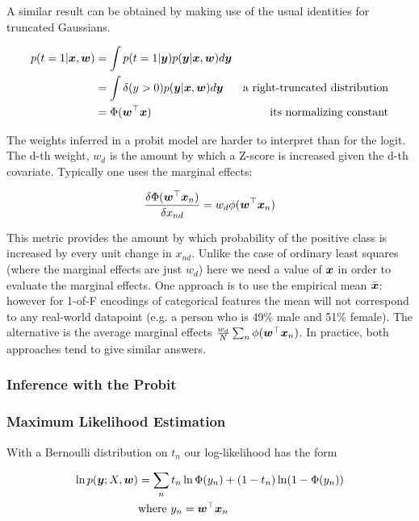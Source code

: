 A similar result can be obtained by making use of the usual identities for truncated Gaussians.

\begin{align}
p(t = 1 | \bm x, \bm w) & = \int p(t = 1 | \bm y) p(\bm y | \bm x, \bm w) d\bm y \\
 & = \int \delta(y > 0) p(\bm y | \bm x, \bm w) d\bm y & \text{a right-truncated distribution} \\
 & = \Phi(\bm w^\top\bm x) & \text{its normalizing constant}
\end{align}


The weights inferred in a probit model are harder to interpret than for the logit. The d-th weight, $w_d$ is the amount by which a Z-score is increased given the d-th covariate. Typically one uses the marginal effects:

\begin{equation}
\frac{\delta \Phi(\bm w^\top\bm x_n)}{\delta x_{nd}} = w_d \phi(\bm w^\top\bm x_n)
\end{equation}

This metric provides the amount by which probability of the positive class is increased by every unit change in $x_{nd}$. Unlike the case of ordinary least squares (where the marginal effects are just $w_d$) here we need a value of $\bm x$ in order to evaluate the marginal effects. One approach is to use the empirical mean $\bar{\bm x}$: however for 1-of-F encodings of categorical features the mean will not correspond to any real-world datapoint (e.g. a person who is 49\% male and 51\% female). The alternative is the average marginal effects $\frac{w_d}{N}\sum_n\phi(\bm w^\top\bm x_n)$. In practice, both approaches tend to give similar answers.



\subsubsection{Inference with the Probit}
\subsubsection*{Maximum Likelihood Estimation}
With a Bernoulli distribution on $t_n$ our log-likelihood has the form

\begin{align}
\ln p(\bm y; X, \bm w) & = \sum_n t_n \ln \Phi(y_n) + (1 - t_n) \ln (1 - \Phi(y_n)) \\
& \text{where } y_n = \bm w^\top\bm x_n
\end{align}

